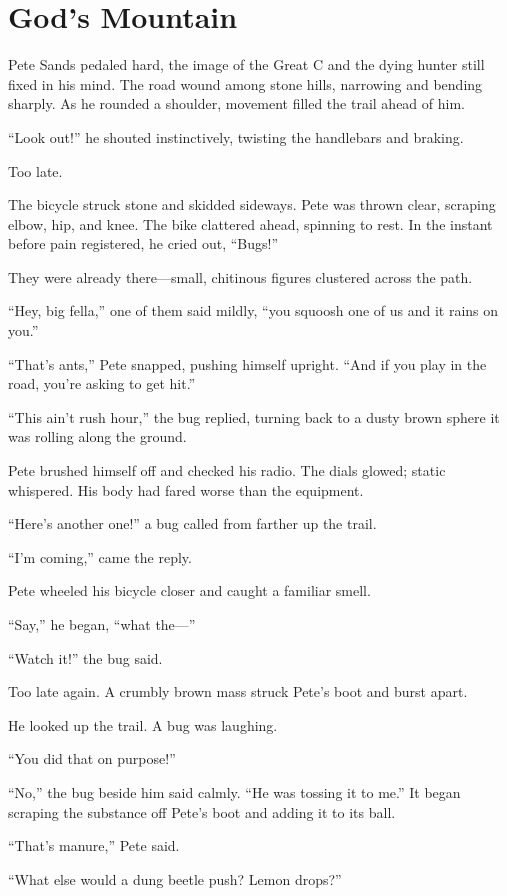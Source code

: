 \chapter{God's Mountain}

Pete Sands pedaled hard, the image of the Great C and the dying hunter still fixed in his mind. The road wound among stone hills, narrowing and bending sharply. As he rounded a shoulder, movement filled the trail ahead of him.

“Look out!” he shouted instinctively, twisting the handlebars and braking.

Too late.

The bicycle struck stone and skidded sideways. Pete was thrown clear, scraping elbow, hip, and knee. The bike clattered ahead, spinning to rest. In the instant before pain registered, he cried out, “Bugs!”

They were already there—small, chitinous figures clustered across the path.

“Hey, big fella,” one of them said mildly, “you squoosh one of us and it rains on you.”

“That’s ants,” Pete snapped, pushing himself upright. “And if you play in the road, you’re asking to get hit.”

“This ain’t rush hour,” the bug replied, turning back to a dusty brown sphere it was rolling along the ground.

Pete brushed himself off and checked his radio. The dials glowed; static whispered. His body had fared worse than the equipment.

“Here’s another one!” a bug called from farther up the trail.

“I’m coming,” came the reply.

Pete wheeled his bicycle closer and caught a familiar smell.

“Say,” he began, “what the—”

“Watch it!” the bug said.

Too late again. A crumbly brown mass struck Pete’s boot and burst apart.

He looked up the trail. A bug was laughing.

“You did that on purpose!”

“No,” the bug beside him said calmly. “He was tossing it to me.” It began scraping the substance off Pete’s boot and adding it to its ball.

“That’s manure,” Pete said.

“What else would a dung beetle push? Lemon drops?”


